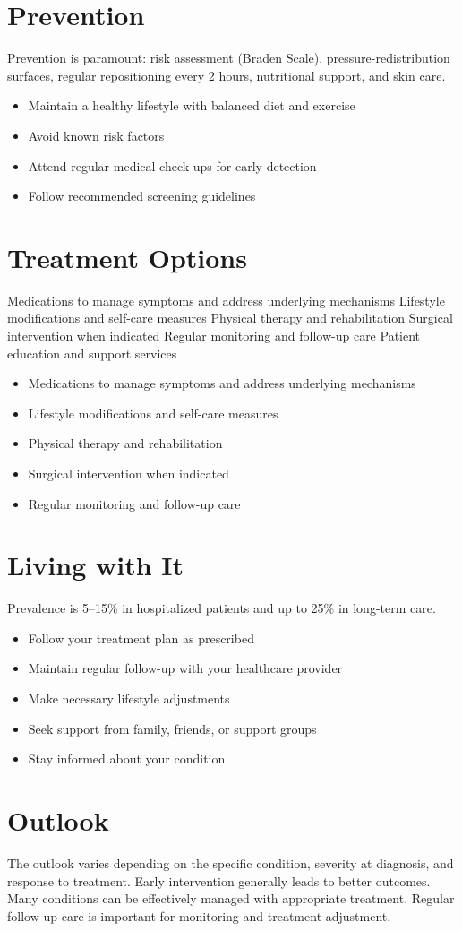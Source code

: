 \section{Prevention}
Prevention is paramount: risk assessment (Braden Scale), pressure-redistribution surfaces, regular repositioning every 2 hours, nutritional support, and skin care.

\begin{itemize}[noitemsep]
  \item Maintain a healthy lifestyle with balanced diet and exercise
  \item Avoid known risk factors
  \item Attend regular medical check-ups for early detection
  \item Follow recommended screening guidelines
\end{itemize}
\section{Treatment Options}
Medications to manage symptoms and address underlying mechanisms Lifestyle modifications and self-care measures Physical therapy and rehabilitation Surgical intervention when indicated Regular monitoring and follow-up care Patient education and support services

\begin{itemize}[noitemsep]
  \item Medications to manage symptoms and address underlying mechanisms
  \item Lifestyle modifications and self-care measures
  \item Physical therapy and rehabilitation
  \item Surgical intervention when indicated
  \item Regular monitoring and follow-up care
\end{itemize}
\section{Living with It}
Prevalence is 5--15\% in hospitalized patients and up to 25\% in long-term care.

\begin{itemize}[noitemsep]
  \item Follow your treatment plan as prescribed
  \item Maintain regular follow-up with your healthcare provider
  \item Make necessary lifestyle adjustments
  \item Seek support from family, friends, or support groups
  \item Stay informed about your condition
\end{itemize}
\section{Outlook}
The outlook varies depending on the specific condition, severity at diagnosis, and response to treatment. Early intervention generally leads to better outcomes. Many conditions can be effectively managed with appropriate treatment. Regular follow-up care is important for monitoring and treatment adjustment.
